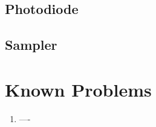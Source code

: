 \documentclass[a4paper]{article}
\begin{document}
\subsection{Photodiode}


\subsection{Sampler}


\section{Known Problems}
\begin{enumerate}
    \item ----
\end{enumerate}


%
%
\end{document}
